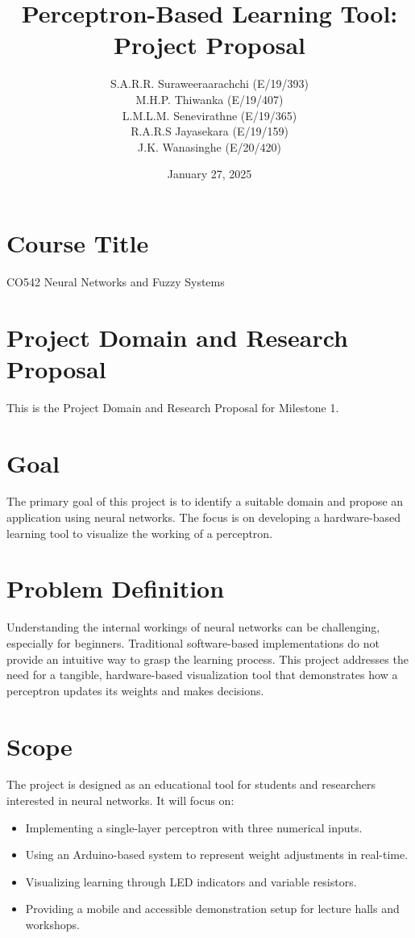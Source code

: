 \documentclass[a4paper,10pt]{article}
\title{Perceptron-Based Learning Tool: Project Proposal}
\author{
    S.A.R.R. Suraweeraarachchi (E/19/393) \\
    M.H.P. Thiwanka (E/19/407) \\
    L.M.L.M. Senevirathne (E/19/365) \\
    R.A.R.S Jayasekara (E/19/159) \\
    J.K. Wanasinghe (E/20/420)
}
\date{January 27, 2025}
\begin{document}
\maketitle

\section*{Course Title}
CO542 Neural Networks and Fuzzy Systems

\section*{Project Domain and Research Proposal}
This is the Project Domain and Research Proposal for Milestone 1.

\section{Goal}
The primary goal of this project is to identify a suitable domain and propose an application using neural networks. The focus is on developing a hardware-based learning tool to visualize the working of a perceptron.

\section{Problem Definition}
Understanding the internal workings of neural networks can be challenging, especially for beginners. Traditional software-based implementations do not provide an intuitive way to grasp the learning process. This project addresses the need for a tangible, hardware-based visualization tool that demonstrates how a perceptron updates its weights and makes decisions.

\section{Scope}
The project is designed as an educational tool for students and researchers interested in neural networks. It will focus on:

\begin{itemize}
    \item Implementing a single-layer perceptron with three numerical inputs.
    \item Using an Arduino-based system to represent weight adjustments in real-time.
    \item Visualizing learning through LED indicators and variable resistors.
    \item Providing a mobile and accessible demonstration setup for lecture halls and workshops.
\end{itemize}
\end{document}
